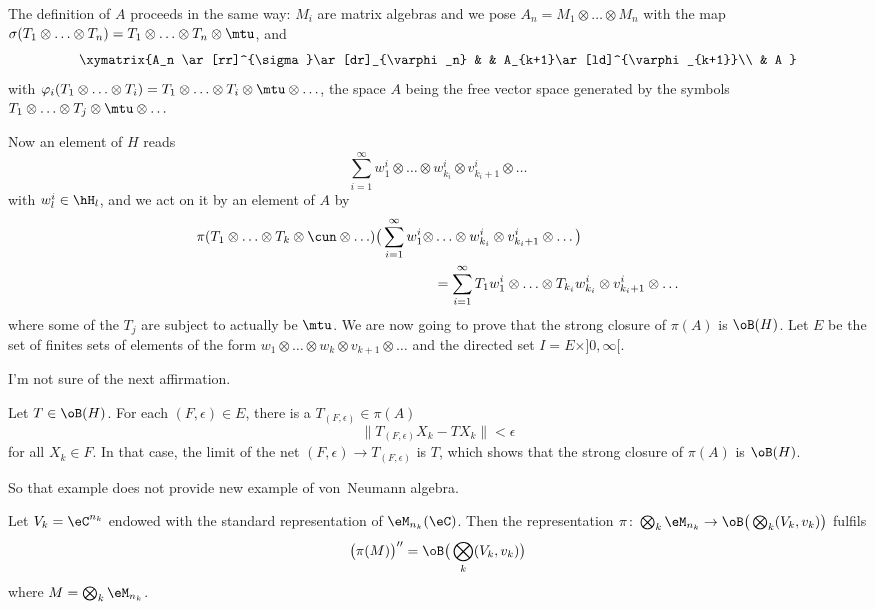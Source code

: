 The definition of $A$ proceeds in the same way: $M_i$ are matrix algebras and we pose $A_n=M_1 \otimes\ldots\otimes  M_n$ with the map $\sigma(T_1\otimes\ldots\otimes  T_n)=T_1\otimes\ldots\otimes  T_n\otimes\mtu$, and
\[
	\xymatrix{%
	A_n \ar[rr]^{\sigma}\ar[dr]_{\varphi_n}		&	&	A_{k+1}\ar[ld]^{\varphi_{k+1}}\\
	&							A
	}
\]
with $\varphi_i(T_1\otimes\ldots\otimes  T_i)=T_1\otimes\ldots\otimes  T_i\otimes\mtu \otimes\ldots$, the space $A$ being the free vector space generated by the symbols $T_1\otimes\ldots\otimes  T_j\otimes\mtu\otimes\ldots$

Now an element of $H$ reads
\[
	\sum_{i=1}^{\infty}w_1^i\otimes\ldots\otimes  w_{k_i}^i\otimes v_{k_i+1}^i\otimes\ldots
\]
with $w_l^i\in\hH_l$, and we act on it by an element of $A$ by
\begin{equation}
	\begin{split}
		\pi(T_1\otimes\ldots\otimes T_k\otimes\cun\otimes\ldots)\big( \sum_{i=1}^{\infty} w_1^i\otimes&\ldots\otimes w_{k_i}^i\otimes v_{k_i+1}^i\otimes\ldots \big)\\
		&=	\sum_{i=1}^{\infty}T_1w_1^i\otimes\ldots\otimes T_{k_i}w_{k_i}^i\otimes v_{k_i+1}^i\otimes\ldots
	\end{split}
\end{equation}
where some of the $T_j$ are subject to actually be $\mtu$. We are now going to prove that the strong closure of $\pi(A)$ is $\oB(H)$. Let $E$ be the set of finites sets of elements of the form $w_1\otimes\ldots\otimes  w_k\otimes v_{k+1}\otimes\ldots$ and the directed set $I=E\times ]0,\infty[$.

\begin{probleme}
	I'm not sure of the next affirmation.
\end{probleme}

Let $T\in\oB(H)$. For each $(F,\epsilon)\in E$, there is a $T_{(F,\epsilon)}\in\pi(A)$
\begin{equation}
	\| T_{(F,\epsilon)}X_k-TX_k \|<\epsilon
\end{equation}
for all $X_k\in F$. In that case, the limit of the net $(F,\epsilon)\to T_{(F,\epsilon)}$ is $T$, which shows that the strong closure of $\pi(A)$ is $\oB(H)$.

So that example does not provide new example of von~Neumann algebra.
\begin{proposition}
	Let $V_k=\eC^{n_k}$ endowed with the standard representation of $\eM_{n_k}(\eC)$. Then the representation $\pi\colon \bigotimes_k \eM_{n_k}\to \oB\big( \bigotimes_k(V_k,v_k) \big)$ fulfils
	\[
		\big( \pi(M) \big)''=\oB\big( \bigotimes_k(V_k,v_k) \big)
	\]
	where $M=\bigotimes_k\eM_{n_k}$.
\end{proposition}

